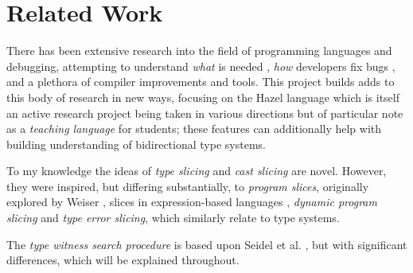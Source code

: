 \section{Related Work}
\label{sec:RelatedWork}
There has been extensive research into the field of programming languages and debugging, attempting to understand \textit{what} is needed \cite{DebugNeeds}, \textit{how} developers fix bugs \cite{HowFixBugs}, and a plethora of compiler improvements and tools. This project builds adds to this body of research in new ways, focusing on the Hazel language which is itself an active research project being taken in various directions but of particular note as a \textit{teaching language} \cite{HazelTutor} for students; these features can additionally help with building understanding of bidirectional type systems. 

To my knowledge the ideas of \textit{type slicing} and \textit{cast slicing} are novel. However, they were inspired, but differing substantially, to \textit{program slices}, originally explored by Weiser \cite{ProgSlice}, slices in expression-based languages \cite{FunctionalProgExplain}, \textit{dynamic program slicing} \cite{DynProgSlice} and \textit{type error slicing}\cite{ErrSlice, HaackErrSlice}, which similarly relate to type systems.

The \textit{type witness search procedure} is	 based upon Seidel et al. \cite{SearchProc}, but with significant differences, which will be explained throughout.